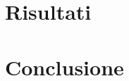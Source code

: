 \documentclass{article}
\begin{document}
\section{Risultati}
\section{Conclusione}





\end{document}
